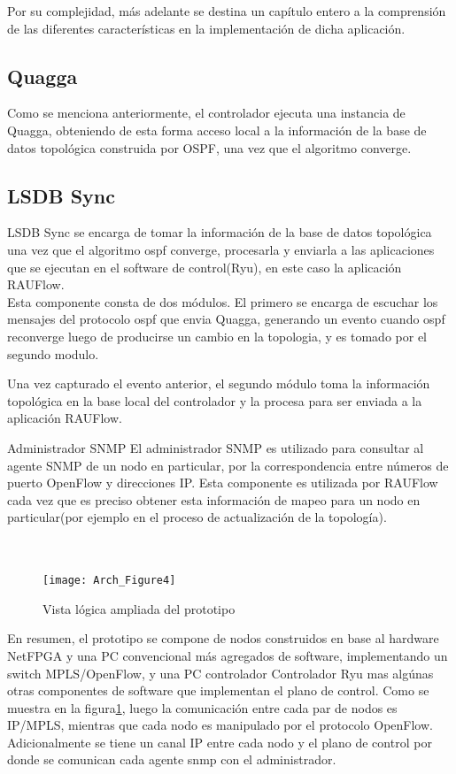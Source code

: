 Por su complejidad, m\'as adelante se destina un cap\'itulo entero a la comprensi\'on de las diferentes características en la implementaci\'on de dicha aplicaci\'on. 

\subsection{Quagga}
Como se menciona anteriormente, el controlador ejecuta una instancia de Quagga, obteniendo de esta forma acceso local a la información de la base de datos topol\'ogica construida por OSPF, una vez que el algoritmo converge.

\subsection{LSDB Sync}
LSDB Sync se encarga de tomar la información de la base de datos topol\'ogica una vez que el algoritmo ospf converge, procesarla y enviarla a las aplicaciones que se ejecutan en el software de control(Ryu), en este caso la aplicación RAUFlow.\\

Esta componente consta de dos módulos. El primero se encarga de escuchar los mensajes del protocolo ospf que envia Quagga, generando un evento cuando ospf reconverge luego de producirse un cambio en la topologia, y es tomado por el segundo modulo.

Una vez capturado el evento anterior, el segundo m\'odulo toma la información topol\'ogica en la base local del controlador y la procesa para ser enviada a la aplicación RAUFlow.

\begin{subsection}{Administrador SNMP}
El administrador SNMP es utilizado para consultar al agente SNMP de un nodo en particular, por la correspondencia entre números de puerto OpenFlow y direcciones IP. Esta componente es utilizada por RAUFlow cada vez que es preciso obtener esta información de mapeo para un nodo en particular(por ejemplo en el proceso de actualización de la topolog\'ia).\\\\\

\end{subsection}

\begin{figure}[htbp!] 
\centering    
\texttt{[image: Arch\_Figure4]}
\caption[Vista l\'ogica ampliada del prototipo]{Vista l\'ogica ampliada del prototipo}
\label{fig:OpenSourceRArch4}
\end{figure}

En resumen, el prototipo se compone de nodos construidos en base al hardware NetFPGA y una PC convencional m\'as agregados de software, implementando un switch MPLS/OpenFlow, y una PC controlador Controlador Ryu mas alg\'unas otras componentes de software que implementan el plano de control. Como se muestra en la figura\ref{fig:OpenSourceRArch4}, luego la comunicación entre cada par de nodos es IP/MPLS, mientras que cada nodo es manipulado por el protocolo OpenFlow. Adicionalmente se tiene un canal IP entre cada nodo y el plano de control por donde se comunican cada agente snmp con el administrador.\\

